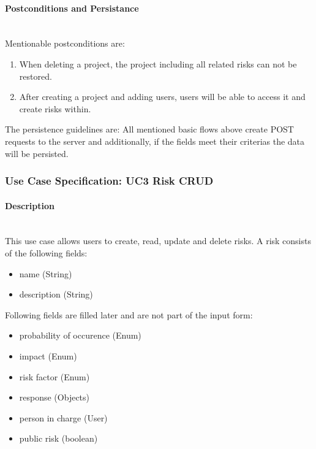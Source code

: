 \paragraph*{Postconditions and Persistance}\mbox{}\\
Mentionable postconditions are:
\begin{enumerate}
	\vspace{-3mm}
	\setlength\itemsep{-1em}
	\item When deleting a project, the project including all related risks can not be restored.
	\item After creating a project and adding users, users will be able to access it and create risks within.
\end{enumerate}

\noindent
The persistence guidelines are: 
\newline
\noindent
All mentioned basic flows above create POST requests to the server and additionally, if the fields meet their criterias the data will be persisted.

\newpage
\subsubsection{Use Case Specification: \ac{UC}3 Risk CRUD}
\label{sec:domainBbd}

\paragraph*{Description}\mbox{}\\
This use case allows users to create, read, update and delete risks. 
A risk consists of the following fields:
\begin{itemize}
	\vspace{-3mm}
	\setlength\itemsep{-1em}
	\item name (String)
	\item description (String)
\end{itemize}
Following fields are filled later and are not part of the input form:
\begin{itemize}
	\vspace{-3mm}
	\setlength\itemsep{-1em}
	\item probability of occurence (Enum)
	\item impact (Enum)
	\item risk factor (Enum)
	\item response (Objects)  
	\item person in charge (User)
	\item public risk (boolean)
\end{itemize}

